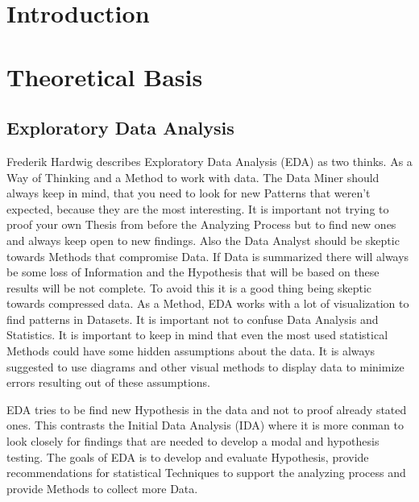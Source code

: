 \documentclass[a4paper, 12pt, oneside]{scrbook}
\begin{document}
	\frontmatter
	
	
	\tableofcontents
	\listoffigures
	\nocite{*}

	\mainmatter

	\pagebreak
	\chapter{Introduction} 
	
	\chapter{Theoretical Basis}
	
		\section{Exploratory Data Analysis}
			
			\noindent Frederik Hardwig describes Exploratory Data Analysis (\ac{EDA}) as two thinks. As a Way of Thinking and a Method to work with data. 
			The Data Miner should always keep in mind, that you need to look for new Patterns that weren't expected, because they are the most interesting. It is important not trying to proof your own Thesis from before the Analyzing Process but to find new ones and always keep open to new findings. Also the Data Analyst should be skeptic towards Methods that compromise Data. If Data is summarized there will always be some loss of Information and the Hypothesis that will be based on these results will be not complete. To avoid this it is a good thing being skeptic towards compressed data. 
			As a Method, \ac{EDA} works with a lot of visualization to find patterns in Datasets. It is important not to confuse Data Analysis and Statistics. It is important to keep in mind that even the most used statistical Methods could have some hidden assumptions about the data. It is always suggested to use diagrams and other visual methods to display data to minimize errors resulting out of these assumptions.\cite{Hardwig:Explortory_Data_Analysis}
			
			\noindent \ac{EDA} tries to be find new Hypothesis in the data and not to proof already stated ones. This contrasts the Initial Data Analysis (\ac{IDA}) where it is more conman to look closely for findings that are needed to develop a modal and hypothesis testing. The goals of \ac{EDA} is to develop and evaluate Hypothesis, provide recommendations for statistical Techniques to support the analyzing process and provide Methods to collect more Data. 
			
\end{document}
